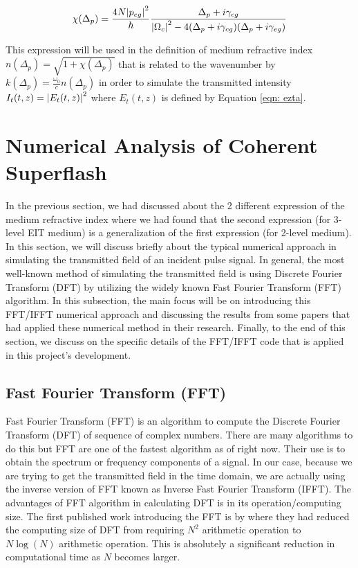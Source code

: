 \begin{equation}
    \chi(\Delta_{p}) = \frac{4 N \abs{p_{eg}}^{2}}{\hbar} \frac{\Delta_{p} + i \gamma_{cg}}{\abs{\Omega_{c}}^{2} - 4(\Delta_{p} + i \gamma_{cg})(\Delta_{p} + i \gamma_{eg})}
\end{equation}

This expression will be used in the definition of medium refractive index $n(\Delta_{p}) = \sqrt{1 + \chi(\Delta_{p})}$ that is related to the wavenumber by $k(\Delta_{p}) = \frac{\omega_{0}}{c} n(\Delta_{p})$ in order to simulate the transmitted intensity $I_{t}(t, z) = \abs{E_{t}(t, z)}^{2}$ where $E_{t}(t, z)$ is defined by Equation \ref{eqn: ezta}.


\section{Numerical Analysis of Coherent Superflash}\label{numerical}
In the previous section, we had discussed about the 2 different expression of the medium refractive index where we had found that the second expression (for 3-level EIT medium) is a generalization of the first expression (for 2-level medium). In this section, we will discuss briefly about the typical numerical approach in simulating the transmitted field of an incident pulse signal. In general, the most well-known method of simulating the transmitted field is using Discrete Fourier Transform (DFT) by utilizing the widely known Fast Fourier Transform (FFT) algorithm. In this subsection, the main focus will be on introducing this FFT/IFFT numerical approach and discussing the results from some papers that had applied these numerical method in their research. Finally, to the end of this section, we discuss on the specific details of the FFT/IFFT code that is applied in this project's development.

\subsection{Fast Fourier Transform (FFT)}
Fast Fourier Transform (FFT) is an algorithm to compute the Discrete Fourier Transform (DFT) of sequence of complex numbers. There are many algorithms to do this but FFT are one of the fastest algorithm as of right now. Their use is to obtain the spectrum or frequency components of a signal. In our case, because we are trying to get the transmitted field in the time domain, we are actually using the inverse version of FFT known as Inverse Fast Fourier Transform (IFFT). The advantages of FFT algorithm in calculating DFT is in its operation/computing size. The first published work introducing the FFT is by  where they had reduced the computing size of DFT from requiring $N^2$ arithmetic operation to $N \log(N)$ arithmetic operation. This is absolutely a significant reduction in computational time as $N$ becomes larger.

